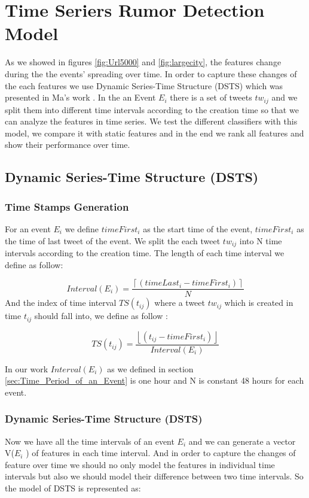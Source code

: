 
\chapter{Time Seriers Rumor Detection Model} %
\label{cha:timr_seriers_rumor_model}
As we showed in figures \ref{fig:Url5000} and \ref{fig:largecity}, the features change during the the events' spreading over time. In order to capture these changes of the each features we use Dynamic Series-Time Structure (DSTS) which was presented in Ma's work \cite{ma2015detect}. In the an Event $E_{i}$ there is a set of tweets $tw_{ij}$ and we split them into different time intervals according to the creation time so that we can analyze the features in time series. We test the different classifiers with this model, we compare it with static features and in the end we rank all features and show their performance over time.
  \section{ Dynamic Series-Time Structure (DSTS)} 
   \subsection{Time Stamps Generation} 
   For an event $E_i$ we define $timeFirst_i$ as the start time of the event, $timeFirst_i$ as the time of last tweet of the event. We split the each tweet $tw_{ij}$ into N time intervals according to the creation time. The length of each time interval we define as follow: 
   
\begin{equation}
Interval(E_i)=\frac{\left \lceil { (timeLast_i-timeFirst_i) }\right \rceil}{N}
\end{equation}
And the index of time interval $TS(t_{ij})$ where a tweet $tw_{ij}$ which is created in time $t_{ij}$ should fall into, we define as follow :

\begin{equation}
TS(t_{ij})=\frac{\left \lfloor { (t_{ij}-timeFirst_i) }\right \rfloor}{Interval(E_i)}
\end{equation}

In our work $Interval(E_i)$ as we defined in section \ref{sec:Time_Period_of_an_Event} is one hour and N is constant 48 hours for each event.  
   
   \subsection{ Dynamic Series-Time Structure (DSTS)} 
Now we have all the time intervals of an event $E_i$ and we can generate a vector V($E_i$ ) of features in each time interval. And in order to capture the changes of feature over time we should no only model the features in individual time intervals but also we should model their difference between two time intervals. So the model of  DSTS is represented as:  

